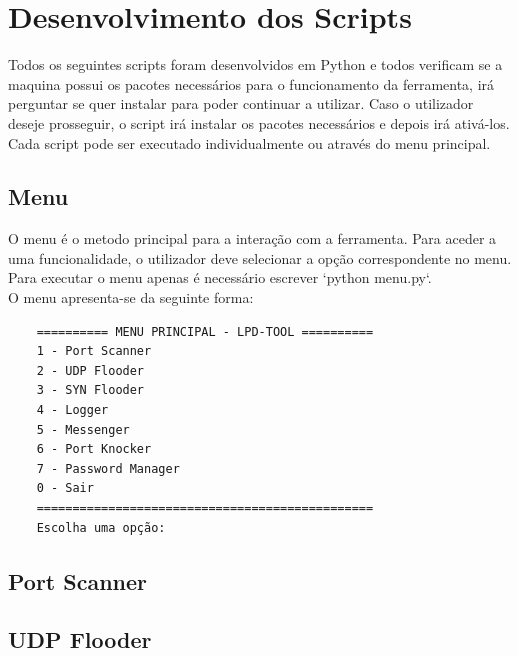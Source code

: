 \documentclass[a4paper]{article}
\begin{document}
\newpage
\section{Desenvolvimento dos Scripts}\label{dev}
Todos os seguintes scripts foram desenvolvidos em Python e todos verificam se a maquina possui os pacotes necessários
para o funcionamento da ferramenta, irá perguntar se quer instalar para poder continuar a utilizar. Caso
o utilizador deseje prosseguir, o script irá instalar os pacotes necessários e depois irá ativá-los.
Cada script pode ser executado individualmente ou através do menu principal.

\subsection{Menu}
O menu é o metodo principal para a interação com a ferramenta. Para aceder a uma funcionalidade, o utilizador deve selecionar a opção correspondente no menu.
Para executar o menu apenas é necessário escrever `python menu.py`.\\

O menu apresenta-se da seguinte forma:
\begin{verbatim}
    ========== MENU PRINCIPAL - LPD-TOOL ==========
    1 - Port Scanner
    2 - UDP Flooder
    3 - SYN Flooder
    4 - Logger
    5 - Messenger
    6 - Port Knocker
    7 - Password Manager
    0 - Sair
    ===============================================
    Escolha uma opção: 
\end{verbatim}

\newpage
\subsection{Port Scanner}

\newpage
\subsection{UDP Flooder}

\newpage
\end{document}
